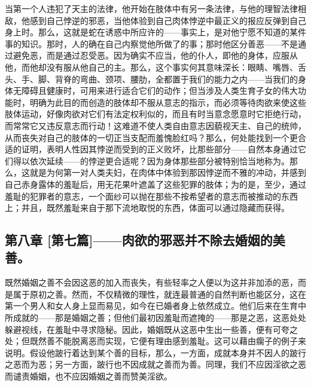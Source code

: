 当第一个人违犯了天主的法律，他开始在肢体中有另一条法律，与他的理智法律相敌，他感到自己悖逆的邪恶，当他体验到自己肉体悖逆中最正义的报应反弹到自己身上时。那么，这就是蛇在诱惑中所应许的——事实上，是对他宁愿不知道的某件事的知识。那时，人的确在自己内察觉他所做了的事；那时他区分善恶——不是通过避免恶，而是通过忍受恶。因为确实不应当，他的仆人，即他的身体，应服从他，而他却没有服从他自己的主。那么，这个事实何其意味深长：眼睛、嘴唇、舌头、手、脚、背脊的弯曲、颈项、腰肋，全都置于我们的能力之内——当我们的身体无障碍且健康时，可用来进行适合它们的动作；但当涉及人类生育子女的伟大功能时，明确为此目的而创造的肢体却不服从意志的指示，而必须等待肉欲来使这些肢体运动，好像肉欲对它们有法定权利似的，而且有时当意念愿意时它拒绝行动，而常常它又违反意志而行动！这难道不使人类自由意志因藐视天主、自己的统帅，从而丧失对自己的肢体的一切正当支配而羞愧脸红吗？那么，何处能找到一个更合适的证明，表明人性因其悖逆而受到的正义败坏，比那些部分——自然本身通过它们得以依次延续——的悖逆更合适呢？因为身体那些部分被特别恰当地称为。那么，这就是为何第一对人类夫妇，在肉体中体验到那因悖逆而不雅的冲动，并感到自己赤身露体的羞耻后，用无花果叶遮盖了这些犯罪的肢体；为的是，至少，通过羞耻的犯罪者的意志，一个面纱可以抛在那些不按希望者的意志而被推动的东西上；并且，既然羞耻来自于那下流地取悦的东西，体面可以通过隐藏而获得。\par


\subsection{第八章 [第七篇]——肉欲的邪恶并不除去婚姻的美善。}

既然婚姻之善不会因这恶的加入而丧失，有些轻率之人便以为这并非加添的恶，而是属于原初之善。然而，不仅精微的理性，就连最普通的自然判断也能区分，这在第一个男人和女人身上显而易见，如今在已婚者身上依然成立。他们后来在生育中所成就的——那是婚姻之善；但他们最初因羞耻而遮掩的——那是之恶，这恶处处躲避视线，在羞耻中寻求隐秘。因此，婚姻既从这恶中生出一些善，便有可夸之处；但既然善不能脱离恶而实现，它便有理由感到羞耻。这可以藉由瘸子的例子来说明。假设他跛行着达到某个善的目标，那么，一方面，成就本身并不因人的跛行之恶而为恶；另一方面，跛行也不因成就之善而为善。同理，我们不应因淫欲之恶而谴责婚姻，也不应因婚姻之善而赞美淫欲。\par


